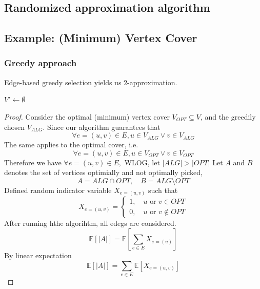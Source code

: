 \documentclass[10pt]{article}
\theoremstyle{definition}
\begin{document}
\subsection{Randomized approximation algorithm}
\subsection{Example: (Minimum) Vertex Cover}
\subsubsection{Greedy approach}
Edge-based greedy selection yields us 2-approximation. 

\begin{algorithm}[H]
  $V' \gets \emptyset$\;
  \;
\end{algorithm}
\begin{proof}
  Consider the optimal (minimum) vertex cover $V_{OPT} \subseteq V$, and the greedily chosen $V_{ALG}$. Since our
  algorithm guarantees that 
  \[\forall e = (u, v) \in E, u \in V_{ALG} \lor v \in V_{ALG}\]
  The same applies to the optimal cover, i.e. 
  \[\forall e = (u, v) \in E, u \in V_{OPT} \lor v \in V_{OPT}\]
  Therefore we have $\forall e = (u, v) \in E, $
  WLOG, let $|ALG| > |OPT|$
  Let $A$ and $B$ denotes the set of vertices optimially and not optimally picked, 
  \[A = ALG \cap OPT, \quad B = ALG \setminus OPT\]
  Defined random indicator variable $X_{e = (u, v)}$ such that 
  \[X_{e = (u, v)} = \begin{cases}
    1, \quad u \text{ or } v \in OPT \\
    0, \quad u \text{ or } v \notin OPT 
  \end{cases}\]
  After running hthe algorihtm, all edegs are considered. 
  \[ \mathbb{E}[|A|]= \mathbb{E}[\sum_{e \in E} X_{e = (u)}]\]
  By linear expectation 
  \[\mathbb{E}[|A|] = \sum_{e \in E} \mathbb{E}[X_{e = (u, v)}]\]
\end{proof}
\end{document}
